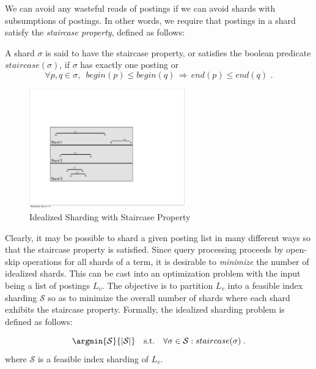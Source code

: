 We can avoid any wasteful reads of postings if we can avoid shards with subsumptions of postings. In other words, we require that postings in a shard satisfy the \emph{staircase property}, defined as follows:  

\begin{definition}
\label{def:staircase}
A shard $\sigma$ is said to have the staircase property, or satisfies the boolean predicate $staircase(\sigma)$, if $\sigma$ has exactly one posting or  
$$\forall p,q \in \sigma, \,\,\, begin(p) \leq begin(q) \, \Rightarrow \, end(p) \leq end(q) \,\,.$$ 
\end{definition}


\begin{figure}[tb]
	\centering
		\includegraphics[width=0.6\textwidth]{resources/idealized.pdf}
	\caption{Idealized Sharding with Staircase Property}
	 \label{fig:idealized_sharding}
\end{figure}

Clearly, it may be possible to shard a given posting list in many
different ways so that the staircase property is satisfied. Since query 
processing proceeds by open-skip operations for all shards of a term, 
it is desirable to \emph{minimize} the number of idealized shards. This 
can be cast into an optimization problem with the input being a list of postings $L_v$. The objective is to partition $L_v$ into a feasible index sharding $\mathcal{S}$ so as to minimize the overall number of shards where each shard exhibits the staircase property. Formally, the idealized sharding problem is defined as follows:

\begin{definition}
$$
  \argmin{\mathcal{S}}{|\mathcal{S}|}  \quad\mbox{s.t.} \quad \forall \sigma \in \mathcal{S} : staircase(\sigma) \;.
$$ where $\mathcal{S}$ is a feasible index sharding of $L_v$.
	
\end{definition}

